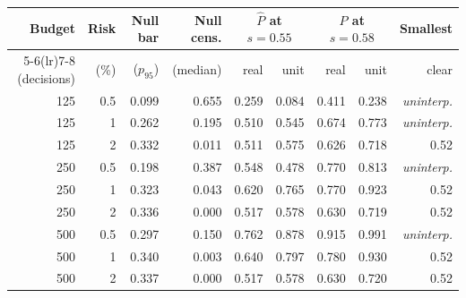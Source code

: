 \begin{tabular}{rrrrrrrrr}
\toprule
Budget & Risk & Null bar & Null cens. & \multicolumn{2}{c}{$\hat P$ at $s=0.55$} & \multicolumn{2}{c}{$\hat P$ at $s=0.58$} & Smallest \\
\cmidrule(lr){5-6}\cmidrule(lr){7-8}
(decisions) & (\%) & ($p_{95}$) & (median) & real & unit & real & unit & clear \\
\midrule
125 & 0.5 & 0.099 & 0.655 & 0.259 & 0.084 & 0.411 & 0.238 & \emph{uninterp.} \\
125 & 1 & 0.262 & 0.195 & 0.510 & 0.545 & 0.674 & 0.773 & \emph{uninterp.} \\
125 & 2 & 0.332 & 0.011 & 0.511 & 0.575 & 0.626 & 0.718 & 0.52 \\
250 & 0.5 & 0.198 & 0.387 & 0.548 & 0.478 & 0.770 & 0.813 & \emph{uninterp.} \\
250 & 1 & 0.323 & 0.043 & 0.620 & 0.765 & 0.770 & 0.923 & 0.52 \\
250 & 2 & 0.336 & 0.000 & 0.517 & 0.578 & 0.630 & 0.719 & 0.52 \\
500 & 0.5 & 0.297 & 0.150 & 0.762 & 0.878 & 0.915 & 0.991 & \emph{uninterp.} \\
500 & 1 & 0.340 & 0.003 & 0.640 & 0.797 & 0.780 & 0.930 & 0.52 \\
500 & 2 & 0.337 & 0.000 & 0.517 & 0.578 & 0.630 & 0.720 & 0.52 \\
\bottomrule
\end{tabular}
